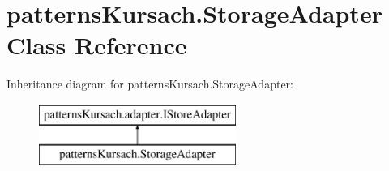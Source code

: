 \hypertarget{classpatterns_kursach_1_1_storage_adapter}{}\section{patterns\+Kursach.\+Storage\+Adapter Class Reference}
\label{classpatterns_kursach_1_1_storage_adapter}
Inheritance diagram for patterns\+Kursach.\+Storage\+Adapter\+:\begin{figure}[H]
\begin{center}
\leavevmode
\includegraphics[height=2.000000cm]{classpatterns_kursach_1_1_storage_adapter}
\end{center}
\end{figure}
